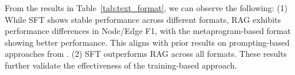 From the results in Table~\ref{tab:text_format}, we can observe the following: (1) While SFT shows stable performance across different formats, RAG exhibits performance differences in Node/Edge F1, with the metaprogram-based format showing better performance. This aligns with prior results on prompting-based approaches from \citet{xue2024comfybenchbenchmarkingllmbasedagents}. (2) SFT outperforms RAG across all formats. These results further validate the effectiveness of the training-based approach.
